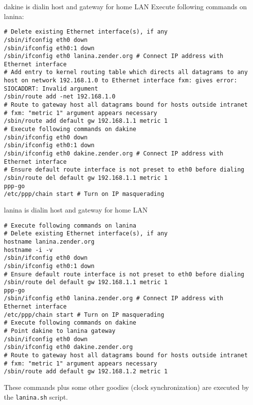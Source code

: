 \documentclass[12pt,twoside]{article}
\begin{document}
\begin{enumerate*}
\item dakine is  dialin host and gateway for home LAN
Execute following commands on lanina:
\begin{verbatim}
# Delete existing Ethernet interface(s), if any
/sbin/ifconfig eth0 down
/sbin/ifconfig eth0:1 down 
/sbin/ifconfig eth0 lanina.zender.org # Connect IP address with Ethernet interface
# Add entry to kernel routing table which directs all datagrams to any host on network 192.168.1.0 to Ethernet interface fxm: gives error: SIOCADDRT: Invalid argument
/sbin/route add -net 192.168.1.0
# Route to gateway host all datagrams bound for hosts outside intranet
# fxm: "metric 1" argument appears necessary
/sbin/route add default gw 192.168.1.1 metric 1
# Execute following commands on dakine
/sbin/ifconfig eth0 down
/sbin/ifconfig eth0:1 down 
/sbin/ifconfig eth0 dakine.zender.org # Connect IP address with Ethernet interface
# Ensure default route interface is not preset to eth0 before dialing
/sbin/route del default gw 192.168.1.1 metric 1
ppp-go 
/etc/ppp/chain start # Turn on IP masquerading
\end{verbatim}

\item lanina is  dialin host and gateway for home LAN
\begin{verbatim}
# Execute following commands on lanina
# Delete existing Ethernet interface(s), if any
hostname lanina.zender.org
hostname -i -v
/sbin/ifconfig eth0 down 
/sbin/ifconfig eth0:1 down 
# Ensure default route interface is not preset to eth0 before dialing
/sbin/route del default gw 192.168.1.1 metric 1
ppp-go 
/sbin/ifconfig eth0 lanina.zender.org # Connect IP address with Ethernet interface
/etc/ppp/chain start # Turn on IP masquerading
# Execute following commands on dakine
# Point dakine to lanina gateway
/sbin/ifconfig eth0 down 
/sbin/ifconfig eth0 dakine.zender.org
# Route to gateway host all datagrams bound for hosts outside intranet
# fxm: "metric 1" argument appears necessary
/sbin/route add default gw 192.168.1.2 metric 1
\end{verbatim}
These commands plus some other goodies (clock synchronization) are
executed by the \verb'lanina.sh' script.


\end{enumerate*}
\end{document}
